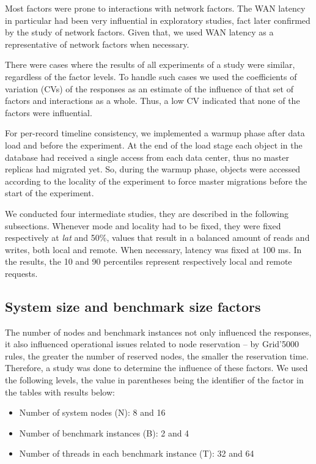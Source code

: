 \documentclass[doublespacing]{bmcart}
\begin{document}
Most factors were prone to interactions with network factors. The WAN latency
in particular had been very influential in exploratory studies, fact later
confirmed by the study of network factors. Given that, we used WAN latency as a
representative of network factors when necessary.

There were cases where the results of all experiments of a study were similar,
regardless of the factor levels. To handle such cases we used the coefficients
of variation (CVs) of the responses as an estimate of the influence of that set
of factors and interactions as a whole. Thus, a low CV indicated that none of
the factors were influential.

For per-record timeline consistency, we implemented a warmup phase after data
load and before the experiment. At the end of the load stage each object in the
database had received a single access from each data center, thus no master
replicas had migrated yet. So, during the warmup phase, objects were accessed
according to the locality of the experiment to force master migrations before
the start of the experiment.

We conducted four intermediate studies, they are described in the following
subsections. Whenever mode and locality had to be fixed, they were fixed
respectively at \textit{lat} and 50\%, values that result in a balanced amount
of reads and writes, both local and remote. When necessary, latency was fixed
at 100 ms. In the results, the 10 and 90 percentiles represent respectively
local and remote requests.

\subsection{System size and benchmark size factors}

The number of nodes and benchmark instances not only influenced the
responses, it also influenced operational issues related to node reservation --
by Grid'5000 rules, the greater the number of reserved nodes, the smaller the
reservation time. Therefore, a study was done to determine the influence of
these factors. We used the following levels, the value in parentheses
being the identifier of the factor in the tables with results below:

\begin{itemize}

\item Number of system nodes (N): 8 and 16

\item Number of benchmark instances (B): 2 and 4

\item Number of threads in each benchmark instance (T): 32 and 64

\end{itemize}
\end{document}

